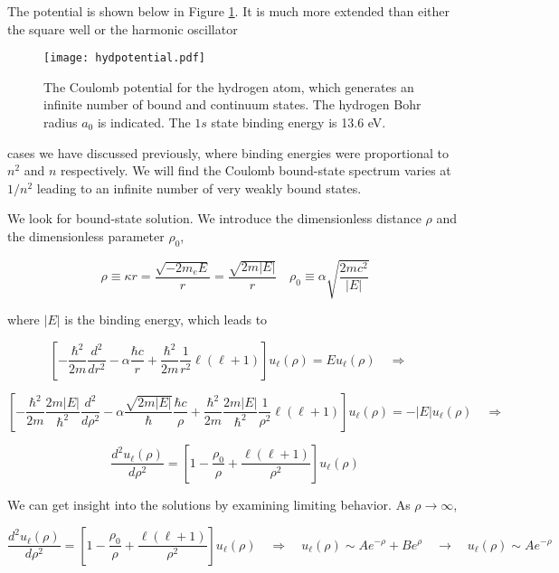 The potential is shown below in Figure \ref{hydpotential}. It is much more
extended than either the square well or the harmonic oscillator


\begin{figure}[H]
  \centering
    \texttt{[image: hydpotential.pdf]}
    \caption{The Coulomb potential for the hydrogen atom, which generates
      an infinite number of bound and continuum states. The hydrogen Bohr
    radius $a_0$ is indicated. The $1s$ state binding energy is 13.6 eV.}
    \label{hydpotential}
\end{figure}

cases we have discussed previously, where binding energies were
proportional to $n^2$ and $n$ respectively. We will find the Coulomb
bound-state spectrum varies at $1 / n^2$ leading to an infinite number of
very weakly bound states. 

We look for bound-state solution. We introduce the dimensionless distance
$\rho$ and the dimensionless parameter $\rho_0$, 

\[
\rho \equiv \kappa r = \frac{\sqrt{-2m_e E}}{r} = \frac{\sqrt{2m|E|}}{r} \quad
\rho_0 \equiv \alpha \sqrt{\frac{2mc^2}{|E|}}
\] \vspace{3px}

where $|E|$ is the binding energy, which leads to 


\[
\left[ -\frac{\hbar^2}{2m} \frac{d^2}{dr^2} - \alpha\frac{\hbar c}{r}
+ \frac{\hbar^2}{2m} \frac{1}{r^2} \ell (\ell + 1) \right] u_{\ell}(\rho) = E u_{\ell}(\rho) 
\quad \Rightarrow \quad 
\]

\[
\left[ -\frac{\hbar^2}{2m} \frac{2m|E|}{\hbar^2} \frac{d^2}{d\rho^2} - \alpha \frac{\sqrt{2m|E|}}{\hbar}\frac{\hbar c}{\rho} + \frac{\hbar^2}{2m} \frac{2m|E|}{\hbar^2} \frac{1}{\rho^2} \ell (\ell + 1) \right] u_{\ell}(\rho) = -|E| u_{\ell}(\rho)
\quad \Rightarrow \quad 
\]

\[
\frac{d^2 u_{\ell}(\rho)}{d\rho^2} = \left[ 1 - \frac{\rho_0}{\rho} + \frac{\ell(\ell + 1)}{\rho^2} \right] u_{\ell}(\rho)
\]

We can get insight into the solutions by examining limiting behavior. As $\rho
\rightarrow \infty$, 

\[
\frac{d^2 u_\ell (\rho)}{d \rho^2} = \left[ 1 - \frac{\rho_0}{\rho}
+ \frac{\ell (\ell +1)}{\rho^2}\right] u_\ell (\rho) \quad \Rightarrow \quad
u_\ell (\rho) \sim Ae^{-\rho} + Be^{\rho} \quad \rightarrow \quad u_\ell (\rho)
\sim Ae^{-\rho} 
\] \vspace{3px}

